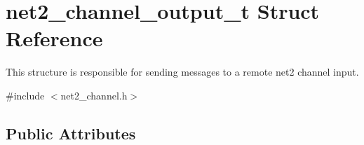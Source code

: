 \hypertarget{structnet2__channel__output__t}{\section{net2\-\_\-channel\-\_\-output\-\_\-t Struct Reference}
\label{structnet2__channel__output__t}
}


This structure is responsible for sending messages to a remote net2 channel input.  




{\ttfamily \#include $<$net2\-\_\-channel.\-h$>$}

\subsection*{Public Attributes}
